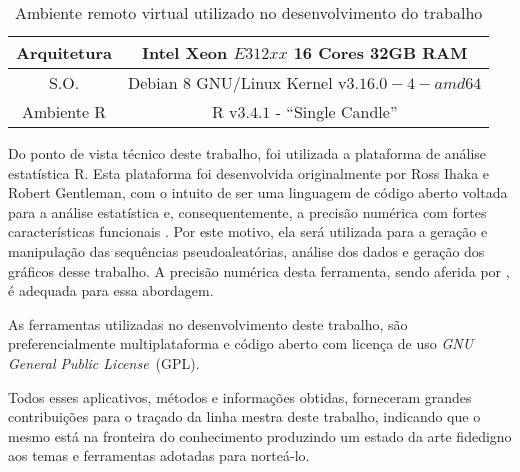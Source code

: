 \begin{table}[hbt]
\centering
\caption{Ambiente remoto virtual utilizado no desenvolvimento do trabalho}\label{virt_env}
\begin{tabular}{c|c}
	\toprule
	Arquitetura & Intel Xeon $E312xx$ 16 Cores 32GB RAM\\
	\midrule
	S.O. & Debian 8 GNU/Linux Kernel v$3.16.0-4-amd64$\\
	\midrule
	Ambiente R & R v$3.4.1$ - ``Single Candle''\\
	\bottomrule
\end{tabular}
\end{table}


Do ponto de vista técnico deste trabalho, foi utilizada a plataforma de análise estatística R. 
Esta plataforma foi desenvolvida originalmente por Ross Ihaka e Robert Gentleman, com o intuito de ser uma linguagem de código aberto voltada para a análise estatística e, consequentemente, a precisão numérica com fortes características funcionais \citep{Rmanual}. 
Por este motivo, ela será utilizada para a geração e manipulação das sequências pseudoaleatórias, análise dos dados e geração dos gráficos desse trabalho. A precisão numérica desta ferramenta, sendo aferida por \citet{Almiron:09}, é adequada para essa abordagem.

  As ferramentas utilizadas no desenvolvimento deste trabalho, são preferencialmente multiplataforma e código aberto com licença de uso \emph{GNU General Public License}~(GPL).

  Todos esses aplicativos, métodos e informações obtidas, forneceram grandes contribuições para o traçado da linha mestra deste trabalho, indicando que o mesmo está na fronteira do conhecimento produzindo um estado da arte fidedigno aos temas e ferramentas adotadas para norteá-lo.

\begin{center}
\end{center}


